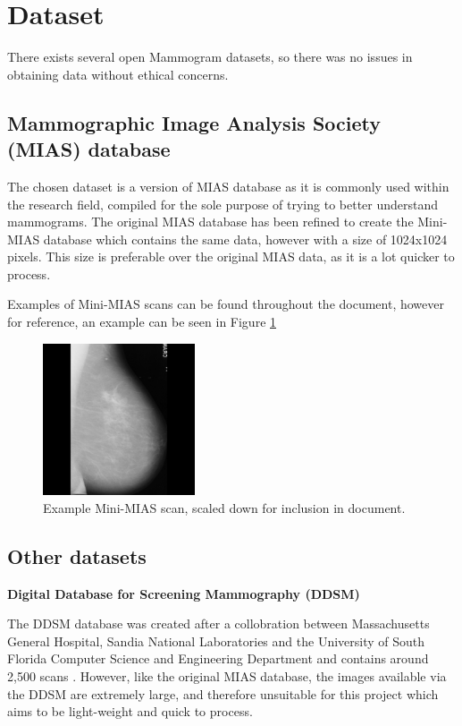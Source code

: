 \section{Dataset}

There exists several open Mammogram datasets, so there was no issues in obtaining data without ethical concerns.

\subsection{Mammographic Image Analysis Society (MIAS) database}

The chosen dataset is a version of \acrfull{MIAS} database as it is commonly used within the research field, compiled for the sole purpose of trying to better understand mammograms. The original \acrshort{MIAS} database has been refined to create the Mini-\acrshort{MIAS} database which contains the same data, however with a size of 1024x1024 pixels. This size is preferable over the original \acrshort{MIAS} data, as it is a lot quicker to process.

Examples of Mini-\acrshort{MIAS} scans can be found throughout the document, however for reference, an example can be seen in Figure \ref{fig:mini-mias}

\begin{figure}[H]
  \centering
  \includegraphics[width=0.4\textwidth]{Chapter2/tools/mias.jpg}
  \caption{Example Mini-MIAS scan, scaled down for inclusion in document.}
  \label{fig:mini-mias}
\end{figure}

\subsection{Other datasets}

\noindent \textbf{Digital Database for Screening Mammography (DDSM)}

The \acrshort{DDSM} database was created after a collobration between Massachusetts General Hospital, Sandia National Laboratories and the University of South Florida Computer Science and Engineering Department and contains around 2,500 scans \cite{Heath_Bowyer_Kopans_Moore_Kegelmeyer_Processing} \cite{Heath_Bowyer_Kopans_Kegelmeyer_Moore_Chang_MunishKumaran_1998}.
However, like the original \acrshort{MIAS} database, the images available via the DDSM are extremely large, and therefore unsuitable for this project which aims to be light-weight and quick to process.

